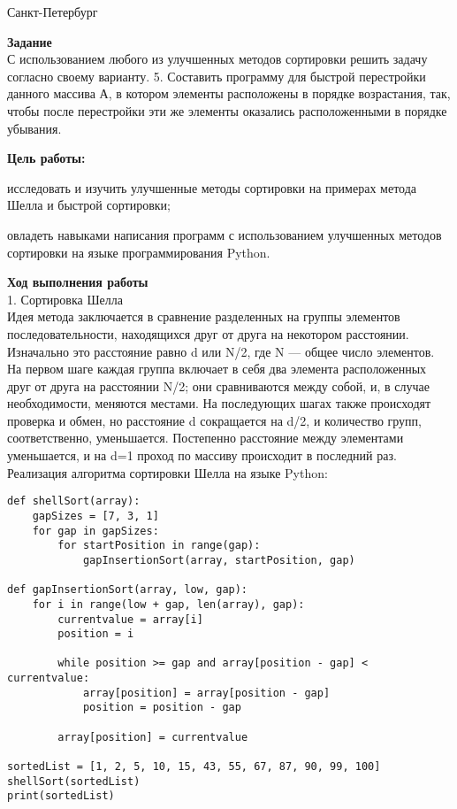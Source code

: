 \documentclass[12pt]{article}
\begin{document}
\par\bigskip\par\bigskip\par\bigskip\par\bigskip\par\bigskip\par\bigskip\par\bigskip\par\bigskip
\begin{center}
Санкт-Петербург
\par{}
\end{center}
\pagebreak
\textbf{Задание} \\

С использованием любого из улучшенных методов сортировки решить задачу согласно
своему варианту.
5. Составить программу для быстрой перестройки данного массива А, в котором элементы
расположены в порядке возрастания, так, чтобы после перестройки эти же элементы
оказались расположенными в порядке убывания. \\
\par
\textbf{ Цель работы:}
\begin{list}{-}{}
\item исследовать и изучить улучшенные методы сортировки на примерах метода Шелла и
быстрой сортировки;
\item овладеть навыками написания программ с использованием улучшенных методов
сортировки на языке программирования Python.
\end{list}


\par
\textbf{Ход выполнения работы}\\
1. Сортировка Шелла\\
Идея метода заключается в сравнение разделенных на группы элементов последовательности, находящихся друг от друга на некотором расстоянии. Изначально это расстояние равно d или N/2, где N — общее число элементов. На первом шаге каждая группа включает в себя два элемента расположенных друг от друга на расстоянии N/2; они сравниваются между собой, и, в случае необходимости, меняются местами. На последующих шагах также происходят проверка и обмен, но расстояние d сокращается на d/2, и количество групп, соответственно, уменьшается. Постепенно расстояние между элементами уменьшается, и на d=1 проход по массиву происходит в последний раз.
Реализация алгоритма сортировки Шелла на языке Python:
\begin{verbatim}
def shellSort(array):
	gapSizes = [7, 3, 1]
	for gap in gapSizes:
		for startPosition in range(gap):
			gapInsertionSort(array, startPosition, gap)

def gapInsertionSort(array, low, gap):
	for i in range(low + gap, len(array), gap):
		currentvalue = array[i]
		position = i

		while position >= gap and array[position - gap] < currentvalue:
			array[position] = array[position - gap]
			position = position - gap

		array[position] = currentvalue

sortedList = [1, 2, 5, 10, 15, 43, 55, 67, 87, 90, 99, 100]
shellSort(sortedList)
print(sortedList)
\end{verbatim}
\end{document}
